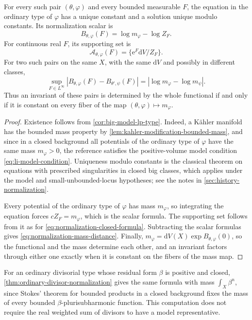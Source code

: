 \begin{theorem}\label{thm:normalization-mass-quotient}
For every such pair $(\theta,\varphi)$ and every bounded measurable $F$, the equation in the ordinary type of $\varphi$ has a unique constant and a solution unique modulo constants. Its normalization scalar is
\[
 B_{\theta,\varphi}(F)=\log m_\varphi-\log Z_F.
\]
For continuous real $F$, its supporting set is
\[
 \mathcal A_{\theta,\varphi}(F)=\{\mathrm{e}^F\mathrm{d}V/Z_F\}.
\]
For two such pairs on the same $X$, with the same $\mathrm{d}V$ and possibly in different classes,
\begin{equation}\label{eq:normalization-mass-distance}
 \sup_{F\in L^\infty}|B_{\theta,\varphi}(F)-B_{\theta',\psi}(F)|
 =|\log m_\varphi-\log m_\psi|.
\end{equation}
Thus an invariant of these pairs is determined by the whole functional if and only if it is constant on every fiber of the map $(\theta,\varphi)\mapsto m_\varphi$.
\end{theorem}
\begin{proof}
Existence follows from \cref{cor:big-model-lp-type}. Indeed, a K\"ahler manifold has the bounded mass property by \cref{lem:kahler-modification-bounded-mass}, and since in a closed background all potentials of the ordinary type of $\varphi$ have the same mass $m_\varphi>0$, the reference satisfies the positive-volume model condition \eqref{eq:li-model-condition}. Uniqueness modulo constants is the classical theorem on equations with prescribed singularities in closed big classes, which applies under the model and small-unbounded-locus hypotheses; see the notes in \cref{sec:history-normalization}.

Every potential of the ordinary type of $\varphi$ has mass $m_\varphi$, so integrating the equation forces $cZ_F=m_\varphi$, which is the scalar formula. The supporting set follows from it as for \eqref{eq:normalization-closed-formula}. Subtracting the scalar formulas gives \eqref{eq:normalization-mass-distance}. Finally, $m_\varphi=\mathrm{d}V(X)\exp B_{\theta,\varphi}(0)$, so the functional and the mass determine each other, and an invariant factors through either one exactly when it is constant on the fibers of the mass map.
\end{proof}

For an ordinary divisorial type whose residual form $\beta$ is positive and closed, \cref{thm:ordinary-divisor-normalization} gives the same formula with mass $\int_X\beta^n$, since Stokes' theorem for bounded products in a closed background fixes the mass of every bounded $\beta$-plurisubharmonic function. This computation does not require the real weighted sum of divisors to have a model representative.


